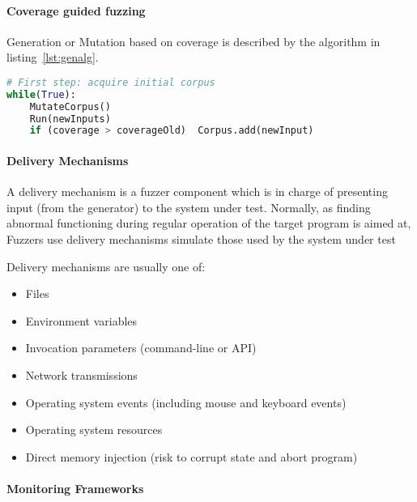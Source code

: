 \paragraph{Coverage guided fuzzing}

Generation or Mutation based on coverage is described by the algorithm in listing~\ref{lst:genalg}.



\begin{lstlisting}[caption={Coverage based data generation}, label={lst:genalg}, language=python]
# First step: acquire initial corpus
while(True):
    MutateCorpus()
    Run(newInputs)
    if (coverage > coverageOld)  Corpus.add(newInput)

\end{lstlisting}


\paragraph{Delivery Mechanisms}

A delivery mechanism is a fuzzer component which is in charge of presenting input (from the generator)
to the system under test. Normally, as finding abnormal functioning during regular operation of the
target program is aimed at, Fuzzers use delivery mechanisms simulate those used by the system under test \cite{mcnally12}

Delivery mechanisms are usually one of:

\begin{itemize}
    \item Files
    \item Environment variables
    \item Invocation parameters (command-line or API)
    \item Network transmissions
    \item Operating system events (including mouse and keyboard events)
    \item Operating system resources
    \item Direct memory injection (risk to corrupt state and abort program)
\end{itemize}


\paragraph{Monitoring Frameworks}

